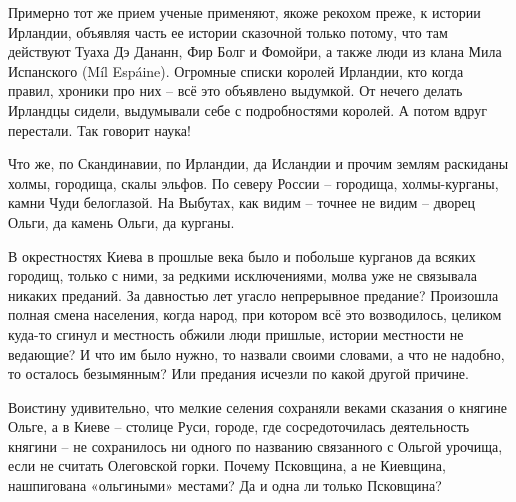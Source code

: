 Примерно тот же прием ученые применяют, якоже рекохом преже, к истории Ирландии, объявляя часть ее истории сказочной только потому, что там действуют Туаха Дэ Дананн, Фир Болг и Фомойри, а также люди из клана Мила Испанского (Míl Espáine). Огромные списки королей Ирландии, кто когда правил, хроники про них – всё это объявлено выдумкой. От нечего делать Ирландцы сидели, выдумывали себе с подробностями королей. А потом вдруг перестали. Так говорит наука!

Что же, по Скандинавии, по Ирландии, да Исландии и прочим землям раскиданы холмы, городища, скалы эльфов. По северу России – городища, холмы-курганы, камни Чуди белоглазой. На Выбутах, как видим – точнее не видим – дворец Ольги, да камень Ольги, да курганы.

В окрестностях Киева в прошлые века было и побольше курганов да всяких городищ, только с ними, за редкими исключениями, молва уже не связывала никаких преданий. За давностью лет угасло непрерывное предание? Произошла полная смена населения, когда народ, при котором всё это возводилось, целиком куда-то сгинул и местность обжили люди пришлые, истории местности не ведающие? И что им было нужно, то назвали своими словами, а что не надобно, то осталось безымянным? Или предания исчезли по какой другой причине.

Воистину удивительно, что мелкие селения сохраняли веками сказания о княгине Ольге, а в Киеве – столице Руси, городе, где сосредоточилась деятельность княгини – не сохранилось ни одного по названию связанного с Ольгой урочища, если не считать Олеговской горки. Почему Псковщина, а не Киевщина, нашпигована «ольгиными» местами? Да и одна ли только Псковщина?


